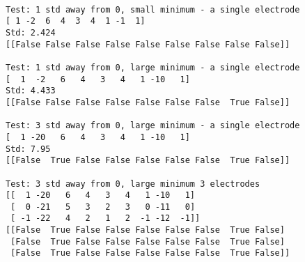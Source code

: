 \documentclass[11pt]{article}
\begin{document}
    \begin{Verbatim}[commandchars=\\\{\}]

Test: 1 std away from 0, small minimum - a single electrode
[ 1 -2  6  4  3  4  1 -1  1]
Std: 2.424
[[False False False False False False False False False]]

Test: 1 std away from 0, large minimum - a single electrode
[  1  -2   6   4   3   4   1 -10   1]
Std: 4.433
[[False False False False False False False  True False]]

Test: 3 std away from 0, large minimum - a single electrode
[  1 -20   6   4   3   4   1 -10   1]
Std: 7.95
[[False  True False False False False False  True False]]

Test: 3 std away from 0, large minimum 3 electrodes
[[  1 -20   6   4   3   4   1 -10   1]
 [  0 -21   5   3   2   3   0 -11   0]
 [ -1 -22   4   2   1   2  -1 -12  -1]]
[[False  True False False False False False  True False]
 [False  True False False False False False  True False]
 [False  True False False False False False  True False]]

    \end{Verbatim}
\end{document}
